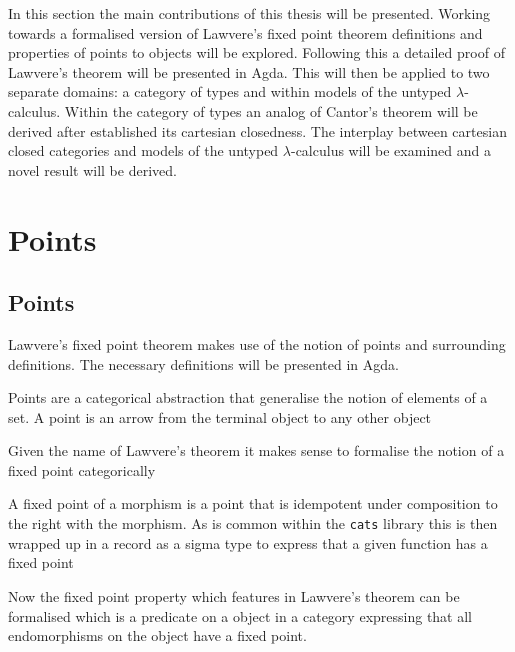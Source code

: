 In this section the main contributions of this thesis will be presented. Working
towards a formalised version of Lawvere's fixed point theorem definitions and
properties of points to objects will be explored. Following this a detailed
proof of Lawvere's theorem will be presented in Agda. This will then be applied
to two separate domains: a category of types and within models of the untyped
$\lambda$-calculus. Within the category of types an analog of Cantor's theorem
will be derived after established its cartesian closedness. The interplay
between cartesian closed categories and models of the untyped $\lambda$-calculus
will be examined and a novel result will be derived.
\section{Points}

\subsection{Points} 
Lawvere's fixed point theorem makes use of the notion of points and surrounding
definitions. The necessary definitions will be presented in Agda.

Points are a categorical abstraction that generalise the notion of elements of
a set. A point is an arrow from the terminal object to any other object



Given the name of Lawvere's theorem it makes sense to formalise the notion of a
fixed point categorically


A fixed point of a morphism is a point that is idempotent under composition to
the right with the morphism. As is common within the \verb|cats| library this is
then wrapped up in a record as a sigma type to express that a given function has
a fixed point


Now the fixed point property which features in Lawvere's theorem can be
formalised which is a predicate on a object in a category expressing that all
endomorphisms on the object have a fixed point.

